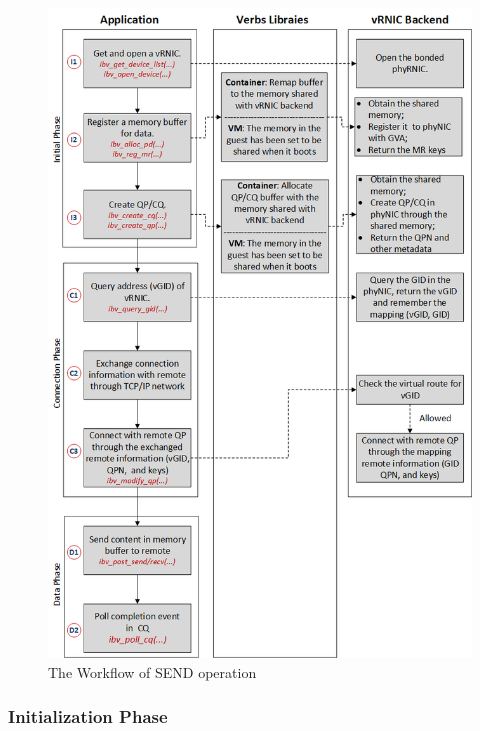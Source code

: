 \begin{figure}[!ht]
	\centering
	\includegraphics[width=0.95\linewidth]{images/RDMA-path.png}
	\caption{The Workflow of \sys SEND operation}
	\label{fig:rdma-path}
\end{figure}


\subsubsection{\textbf{Initialization Phase}}
\
\noindent

